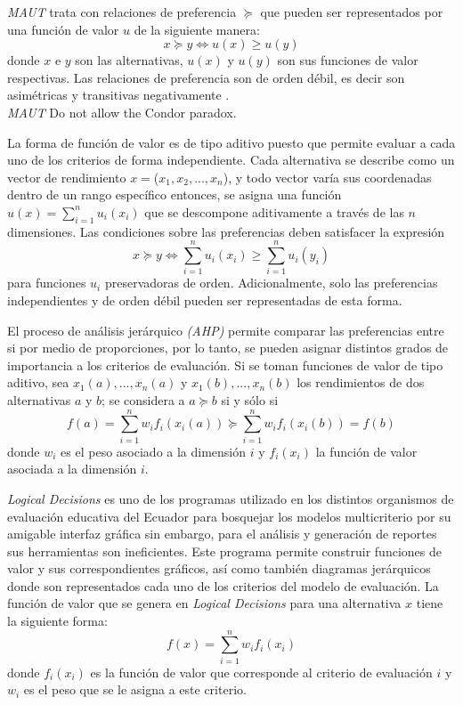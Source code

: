 \textit{MAUT} trata con relaciones de preferencia $\succeq$ que pueden ser representados por
una función de valor $u$ de la siguiente manera:
\[x\succeq y \Leftrightarrow u(x)\geq u(y)\]
donde $x$ e $y$ son las alternativas, $u(x)$ y $u(y)$ son sus funciones de valor respectivas. 
Las relaciones de preferencia son de orden débil, es decir son asimétricas y
transitivas negativamente \citep{3}.\\

\textit{MAUT} Do not allow the Condor paradox.


La forma de función de valor es de tipo aditivo puesto que permite evaluar a cada uno de
los criterios de forma independiente. Cada alternativa se describe como un vector de rendimiento
$x=$($x_{1}, x_{2},..., x_{n}$), y todo vector varía sus coordenadas dentro de un rango específico
entonces, se asigna una función $u(x)=\sum\limits_{i=1}^{n}u_i(x_i)$ que se descompone aditivamente
a través de las $n$ dimensiones. Las condiciones sobre las preferencias deben satisfacer la
expresión
\[x\succeq y \Leftrightarrow \sum\limits_{i=1}^{n}u_i(x_i)\geq \sum\limits_{i=1}^{n}u_i(y_i)\]
para funciones $u_i$ preservadoras de orden\citep{3}. Adicionalmente, solo las
preferencias independientes y de orden débil pueden ser representadas de esta forma\citep{2}.

El proceso de análisis jerárquico \textit{(AHP)} permite comparar las preferencias entre si por
medio de proporciones, por lo tanto, se pueden asignar distintos grados de importancia a los
criterios de evaluación. Si se toman funciones de valor de tipo aditivo, sea $x_{1}(a),...,
x_{n}(a)$ y $x_{1}(b),..., x_{n}(b)$ los rendimientos de dos alternativas $a$ y $b$; se considera a
$a \succeq b$ si y sólo si
\[f(a)=\sum\limits_{i=1}^{n} w_i f_i(x_i(a))\succeq \sum\limits_{i=1}^{n}w_i f_i(x_i(b))=f(b)\]
donde $w_i$ es el peso asociado a la dimensión $i$ y $f_i(x_i)$ la función de valor asociada
a la dimensión $i$\citep{2}.   
   
{\it Logical Decisions\textregistered } es uno de los programas utilizado en los distintos
organismos de evaluación educativa del Ecuador para bosquejar los modelos multicriterio por su 
amigable interfaz gráfica sin embargo, para el análisis y generación de reportes sus herramientas
son ineficientes. Este programa permite construir funciones de valor y sus correspondientes
gráficos, así como también diagramas jerárquicos donde son representados cada uno de los criterios
del modelo de evaluación. La función de valor que se genera en {\it Logical Decisions\textregistered
} para una alternativa $x$ tiene la siguiente forma:
\[f(x)=\sum\limits_{i=1}^{n}w_i f_i(x_i)\]
donde $f_i(x_i)$ es la función de valor que corresponde al criterio de evaluación $i$ y $w_i$
es el peso que se le asigna a este criterio.
 
